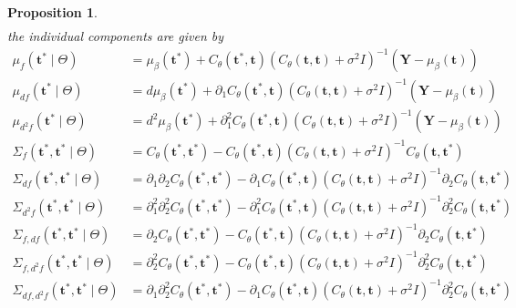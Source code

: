 \documentclass[11pt,]{article}
\newtheorem{proposition}{Proposition}
\theoremstyle{nonumberplain}
\begin{document}
\begin{proposition}
\begin{align*}
\end{align*}
the individual components are given by
\begin{align*}
  \mu_{f}(\mathbf{t}^\ast \mid \Theta) &= \mu_\beta(\mathbf{t}^\ast) + C_\theta(\mathbf{t}^\ast, \mathbf{t})\left(C_\theta(\mathbf{t}, \mathbf{t}) + \sigma^2 I\right)^{-1}\left(\mathbf{Y} - \mu_\beta(\mathbf{t})\right)\\
  \mu_{df}(\mathbf{t}^\ast \mid \Theta) &= d\mu_\beta(\mathbf{t}^\ast) + \partial_1 C_\theta(\mathbf{t}^\ast, \mathbf{t})\left(C_\theta(\mathbf{t}, \mathbf{t}) + \sigma^2 I\right)^{-1}\left(\mathbf{Y} - \mu_\beta(\mathbf{t})\right) \\
  \mu_{d^2\!f}(\mathbf{t}^\ast \mid \Theta) &= d^2\!\mu_\beta(\mathbf{t}^\ast) + \partial_1^2 C_\theta(\mathbf{t}^\ast, \mathbf{t})\left(C_\theta(\mathbf{t}, \mathbf{t}) + \sigma^2 I\right)^{-1}\left(\mathbf{Y} - \mu_\beta(\mathbf{t})\right)\\
  \Sigma_{f}(\mathbf{t}^\ast, \mathbf{t}^\ast \mid \Theta) &= C_\theta(\mathbf{t}^\ast, \mathbf{t}^\ast) - C_\theta(\mathbf{t}^\ast, \mathbf{t})\left(C_\theta(\mathbf{t}, \mathbf{t}) + \sigma^2 I\right)^{-1} C_\theta(\mathbf{t}, \mathbf{t}^\ast)\\
  \Sigma_{df}(\mathbf{t}^\ast, \mathbf{t}^\ast \mid \Theta) &= \partial_1\partial_2C_\theta(\mathbf{t}^\ast, \mathbf{t}^\ast) - \partial_1C_\theta(\mathbf{t}^\ast, \mathbf{t})\left(C_\theta(\mathbf{t}, \mathbf{t}) + \sigma^2 I\right)^{-1} \partial_2C_\theta(\mathbf{t}, \mathbf{t}^\ast)\\
  \Sigma_{d^2\!f}(\mathbf{t}^\ast, \mathbf{t}^\ast \mid \Theta) &= \partial_1^2\partial_2^2 C_\theta(\mathbf{t}^\ast, \mathbf{t}^\ast) - \partial_1^2 C_\theta(\mathbf{t}^\ast, \mathbf{t})\left(C_\theta(\mathbf{t}, \mathbf{t}) + \sigma^2 I\right)^{-1} \partial_2^2 C_\theta(\mathbf{t}, \mathbf{t}^\ast)\\
  \Sigma_{f, df}(\mathbf{t}^\ast, \mathbf{t}^\ast \mid \Theta) &= \partial_2 C_\theta(\mathbf{t}^\ast, \mathbf{t}^\ast) - C_\theta(\mathbf{t}^\ast, \mathbf{t})\left(C_\theta(\mathbf{t}, \mathbf{t}) + \sigma^2 I\right)^{-1} \partial_2 C_\theta(\mathbf{t}, \mathbf{t}^\ast)\\
  \Sigma_{f, d^2\!f}(\mathbf{t}^\ast, \mathbf{t}^\ast \mid \Theta) &= \partial_2^2 C_\theta(\mathbf{t}^\ast, \mathbf{t}^\ast) - C_\theta(\mathbf{t}^\ast, \mathbf{t})\left(C_\theta(\mathbf{t}, \mathbf{t}) + \sigma^2 I\right)^{-1} \partial_2^2 C_\theta(\mathbf{t}, \mathbf{t}^\ast)\\
  \Sigma_{df, d^2\!f}(\mathbf{t}^\ast, \mathbf{t}^\ast \mid \Theta) &= \partial_1 \partial_2^2 C_\theta(\mathbf{t}^\ast, \mathbf{t}^\ast) - \partial_1 C_\theta(\mathbf{t}^\ast, \mathbf{t})\left(C_\theta(\mathbf{t}, \mathbf{t}) + \sigma^2 I\right)^{-1} \partial_2^2 C_\theta(\mathbf{t}, \mathbf{t}^\ast)
\end{align*}
\label{prop:GPposterior}
\end{proposition}
\end{document}
